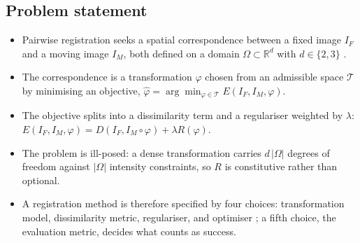 \subsection{Problem statement}
\begin{itemize}
\item Pairwise registration seeks a spatial correspondence between a fixed image $I_F$ and a moving image $I_M$, both defined on a domain $\Omega \subset \mathbb{R}^d$ with $d \in \{2,3\}$ \citep{sotiras2013deformable}.
\item The correspondence is a transformation $\varphi$ chosen from an admissible space $\mathcal{T}$ by minimising an objective, $\hat{\varphi} = \arg\min_{\varphi \in \mathcal{T}} E(I_F, I_M, \varphi)$.
\item The objective splits into a dissimilarity term and a regulariser weighted by $\lambda$: $E(I_F, I_M, \varphi) = D(I_F, I_M \circ \varphi) + \lambda R(\varphi)$.
\item The problem is ill-posed: a dense transformation carries $d\,|\Omega|$ degrees of freedom against $|\Omega|$ intensity constraints, so $R$ is constitutive rather than optional.
\item A registration method is therefore specified by four choices: transformation model, dissimilarity metric, regulariser, and optimiser \citep{sotiras2013deformable}; a fifth choice, the evaluation metric, decides what counts as success.
\end{itemize}

